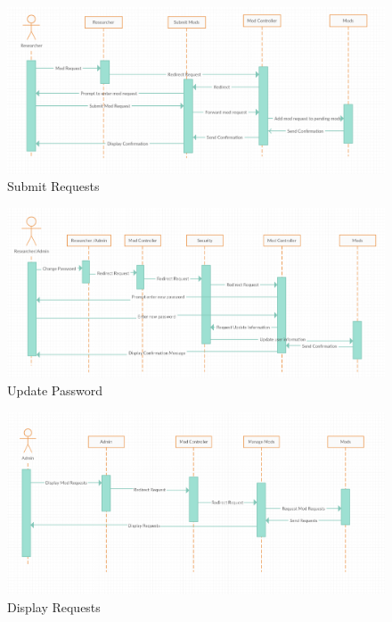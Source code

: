 \documentclass[]{article}
\begin{document}
\begin{figure}[h!]
\centering
\includegraphics[scale=0.51]{SubmitRequests.png}
\caption{Submit Requests}
\label{fig:s6}
\end{figure}

\begin{figure}[h!]
\centering
\includegraphics[scale=0.5]{updatepassword.png}
\caption{Update Password}
\label{fig:s7}
\end{figure}

\begin{figure}[h!]
\centering
\includegraphics[scale=0.5]{displayrequest.png}
\caption{Display Requests}
\label{fig:s8}
\end{figure}
\end{document}
